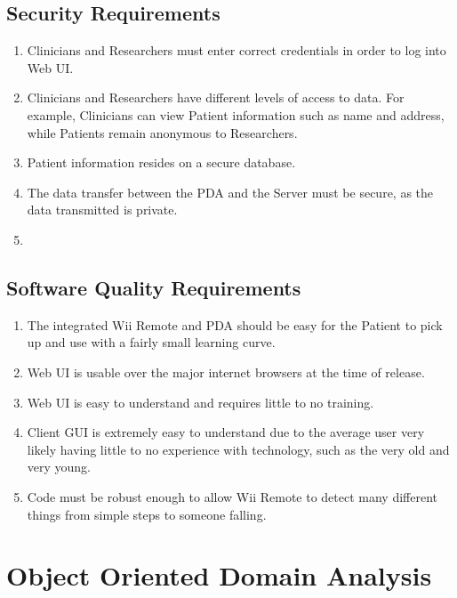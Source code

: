 \documentclass{article}
\begin{document}
\subsection{Security Requirements }
\begin{enumerate}
\item Clinicians and Researchers must enter correct credentials in order to log into Web UI.
\item Clinicians and Researchers have different levels of access to data.  For example, Clinicians can view Patient information such as name and address, while Patients remain anonymous to Researchers.
\item Patient information resides on a secure database.
\item The data transfer between the PDA and the Server must be secure, as the data transmitted is private.
\item 
\end{enumerate}

\subsection{Software Quality Requirements }
\begin{enumerate}
\item The integrated Wii Remote and PDA should be easy for the Patient to pick up and use with a fairly small learning curve.
\item Web UI is usable over the major internet browsers at the time of release.
\item Web UI is easy to understand and requires little to no training.
\item Client GUI is extremely easy to understand due to the average user very likely having little to no experience with technology, such as the very old and very young.
\item Code must be robust enough to allow Wii Remote to detect many different things from simple steps to someone falling.
\end{enumerate}

\section{Object Oriented Domain Analysis}
\end{document}
